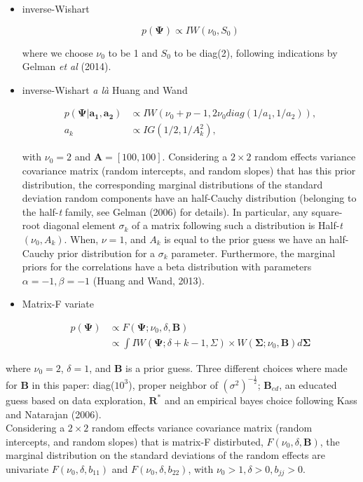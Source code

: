 \documentclass[a4paper]{article}
\begin{document}
\begin{itemize}
	\item inverse-Wishart
	
\begin{equation}
p(\bm{\Psi}) \propto IW(\nu_0, S_{0})
\end{equation}	

where we choose $\nu_0$ to be 1 and $S_{0}$ to be diag(2), following indications by Gelman \textit{et al} (2014).

	\item inverse-Wishart \textit{a là} Huang and Wand

\begin{equation}
	\begin{split}
	p(\bm{\Psi|a_1, a_2})& \propto IW(\nu_0 + p - 1, 2\nu_0 diag(1/a_1, 1/a_2)), \\
	a_k& \propto IG(1/2,1/A_k^2),
	\end{split}
\end{equation}

with $\nu_0 = 2$ and $\bm{A} = [100, 100]$. Considering a $2 \times 2$ random effects variance covariance matrix (random intercepts, and random slopes) that has this prior distribution, the corresponding marginal distributions of the standard deviation random components have an half-Cauchy distribution (belonging to the half-\textit{t} family, see Gelman (2006) for details). In particular, any square-root diagonal element $\sigma_k$ of a matrix following such a distribution is Half-\textit{t}$(\nu_0, A_k)$. When, $\nu = 1$, and $A_k$ is equal to the prior guess we have an half-Cauchy prior distribution for a $\sigma_k$ parameter. Furthermore, the marginal priors for the correlations have a beta distribution with parameters $\alpha = -1, \beta = -1$ (Huang and Wand, 2013).
	
	\item Matrix-F variate
	
\begin{equation}
\begin{split}
p(\bm{\Psi})& \propto F(\bm{\Psi}; \nu_0, \delta, \bm{B}) \\
& \propto \int IW(\bm{\Psi}; \delta + k - 1, \Sigma) \times W(\bm{\Sigma}; \nu_0, \bm{B})d\bm{\Sigma}
\end{split}
\end{equation}	
\end{itemize}

where $\nu_0 = 2$, $\delta = 1$, and $\bm{B}$ is a prior guess. Three different choices where made for $\bm{B}$ in this paper: diag($10^3$), proper neighbor of $(\sigma^2)^{-\frac{1}{2}}$; $\bm{B}_{ed}$, an educated guess based on data exploration, $\bm{R^*}$ and an empirical bayes choice following Kass and Natarajan (2006). \\
Considering a $2 \times 2$ random effects variance covariance matrix (random intercepts, and random slopes) that is matrix-F distirbuted, $F(\nu_0, \delta, \bm{B})$, the marginal distribution on the standard deviations of the random effects are univariate $F(\nu_0, \delta, b_{11})$ and $F(\nu_0, \delta, b_{22})$, with $\nu_0 >1, \delta > 0, b_{jj} > 0$.
\end{document}
